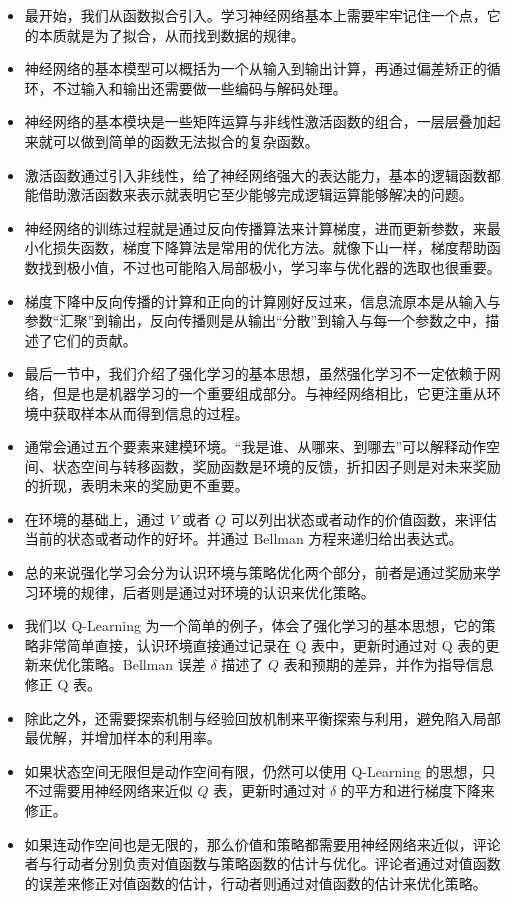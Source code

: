 \begin{itemize}
    \item 最开始，我们从函数拟合引入。学习神经网络基本上需要牢牢记住一个点，它的本质就是为了拟合，从而找到数据的规律。
    \item 神经网络的基本模型可以概括为一个从输入到输出计算，再通过偏差矫正的循环，不过输入和输出还需要做一些编码与解码处理。
    \item 神经网络的基本模块是一些矩阵运算与非线性激活函数的组合，一层层叠加起来就可以做到简单的函数无法拟合的复杂函数。
    \item 激活函数通过引入非线性，给了神经网络强大的表达能力，基本的逻辑函数都能借助激活函数来表示就表明它至少能够完成逻辑运算能够解决的问题。
    \item 神经网络的训练过程就是通过反向传播算法来计算梯度，进而更新参数，来最小化损失函数，梯度下降算法是常用的优化方法。就像下山一样，梯度帮助函数找到极小值，不过也可能陷入局部极小，学习率与优化器的选取也很重要。
    \item 梯度下降中反向传播的计算和正向的计算刚好反过来，信息流原本是从输入与参数“汇聚”到输出，反向传播则是从输出“分散”到输入与每一个参数之中，描述了它们的贡献。
    \item 最后一节中，我们介绍了强化学习的基本思想，虽然强化学习不一定依赖于网络，但是也是机器学习的一个重要组成部分。与神经网络相比，它更注重从环境中获取样本从而得到信息的过程。
    \item 通常会通过五个要素来建模环境。“我是谁、从哪来、到哪去”可以解释动作空间、状态空间与转移函数，奖励函数是环境的反馈，折扣因子则是对未来奖励的折现，表明未来的奖励更不重要。
    \item 在环境的基础上，通过 $V$ 或者 $Q$ 可以列出状态或者动作的价值函数，来评估当前的状态或者动作的好坏。并通过 Bellman 方程来递归给出表达式。
    \item 总的来说强化学习会分为认识环境与策略优化两个部分，前者是通过奖励来学习环境的规律，后者则是通过对环境的认识来优化策略。
    \item 我们以 Q-Learning 为一个简单的例子，体会了强化学习的基本思想，它的策略非常简单直接，认识环境直接通过记录在 Q 表中，更新时通过对 Q 表的更新来优化策略。Bellman 误差 $\delta$ 描述了 $Q$ 表和预期的差异，并作为指导信息修正 Q 表。
    \item 除此之外，还需要探索机制与经验回放机制来平衡探索与利用，避免陷入局部最优解，并增加样本的利用率。
    \item 如果状态空间无限但是动作空间有限，仍然可以使用 Q-Learning 的思想，只不过需要用神经网络来近似 $Q$ 表，更新时通过对 $\delta$ 的平方和进行梯度下降来修正。
    \item 如果连动作空间也是无限的，那么价值和策略都需要用神经网络来近似，评论者与行动者分别负责对值函数与策略函数的估计与优化。评论者通过对值函数的误差来修正对值函数的估计，行动者则通过对值函数的估计来优化策略。

\end{itemize}
